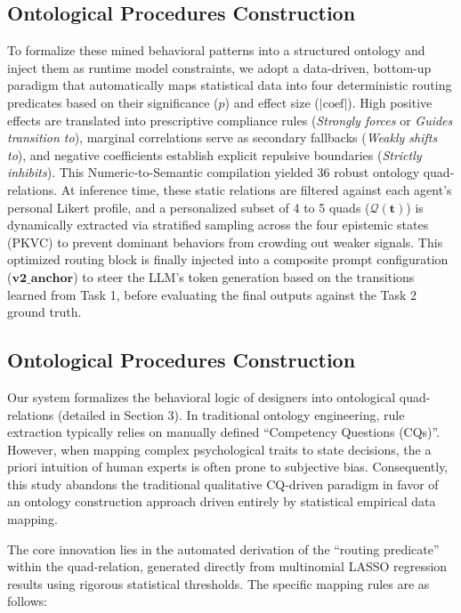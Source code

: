 \documentclass[11pt]{article}
\begin{document}
\subsection{Ontological Procedures Construction}
To formalize these mined behavioral patterns into a structured ontology and inject them as runtime model constraints, we adopt a data-driven, bottom-up paradigm that automatically maps statistical data into four deterministic routing predicates based on their significance ($p$) and effect size ($|\text{coef}|$). High positive effects are translated into prescriptive compliance rules (\textit{Strongly forces} or \textit{Guides transition to}), marginal correlations serve as secondary fallbacks (\textit{Weakly shifts to}), and negative coefficients establish explicit repulsive boundaries (\textit{Strictly inhibits}). This Numeric-to-Semantic compilation yielded 36 robust ontology quad-relations. At inference time, these static relations are filtered against each agent's personal Likert profile, and a personalized subset of 4 to 5 quads ($\mathcal{Q}(\mathbf{t})$) is dynamically extracted via stratified sampling across the four epistemic states (PKVC) to prevent dominant behaviors from crowding out weaker signals. This optimized routing block is finally injected into a composite prompt configuration ($\textbf{v2\_anchor}$) to steer the LLM's token generation based on the transitions learned from Task 1, before evaluating the final outputs against the Task 2 ground truth.

\subsection{Ontological Procedures Construction}
Our system formalizes the behavioral logic of designers into ontological quad-relations (detailed in Section 3). In traditional ontology engineering, rule extraction typically relies on manually defined ``Competency Questions (CQs)''. However, when mapping complex psychological traits to state decisions, the a priori intuition of human experts is often prone to subjective bias. Consequently, this study abandons the traditional qualitative CQ-driven paradigm in favor of an ontology construction approach driven entirely by statistical empirical data mapping.

The core innovation lies in the automated derivation of the ``routing predicate'' within the quad-relation, generated directly from multinomial LASSO regression results using rigorous statistical thresholds. The specific mapping rules are as follows:
\end{document}
